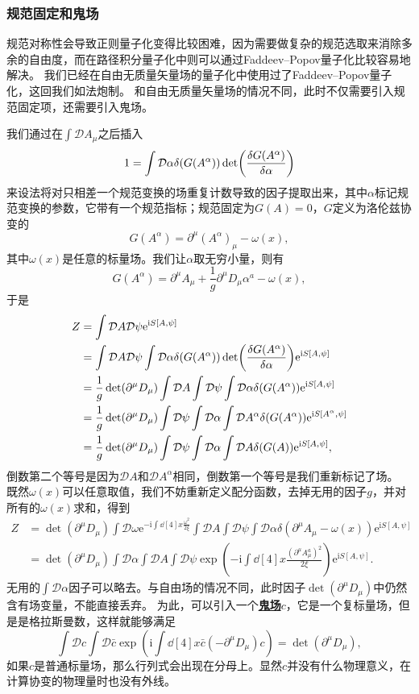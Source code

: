 \documentclass[hyperref, UTF8, a4paper]{ctexart}
\newcommand*{\ii}{\mathrm{i}}
\newcommand*{\ee}{\mathrm{e}}
\newcommand*{\fd}[1]{{\mathcal{D} #1}}
\newcommand{\concept}[1]{\underline{\textbf{#1}}}
\begin{document}
\subsubsection{规范固定和鬼场}

规范对称性会导致正则量子化变得比较困难，因为需要做复杂的规范选取来消除多余的自由度，而在路径积分量子化中则可以通过Faddeev–Popov量子化比较容易地解决。
我们已经在自由无质量矢量场的量子化中使用过了Faddeev–Popov量子化，这回我们如法炮制。
和自由无质量矢量场的情况不同，此时不仅需要引入规范固定项，还需要引入鬼场。

我们通过在$\int \fd{A_\mu}$之后插入
\[
    1 = \int \fd{\alpha} \delta(G(A^\alpha)) \det(\fdv{G(A^\alpha)}{\alpha})
\]
来设法将对只相差一个规范变换的场重复计数导致的因子提取出来，其中$\alpha$标记规范变换的参数，它带有一个规范指标；规范固定为$G(A)=0$，$G$定义为洛伦兹协变的
\begin{equation}
    G(A^\alpha) = \partial^\mu (A^\alpha)_\mu - \omega(x),
\end{equation}
其中$\omega(x)$是任意的标量场。我们让$\alpha$取无穷小量，则有
\[
    G(A^\alpha) = \partial^\mu A_\mu + \frac{1}{g} \partial^\mu D_\mu \alpha^a - \omega(x),
\]
于是
\[
    \begin{aligned}
        Z &= \int \fd{A} \fd{\psi} \ee^{\ii S[A, \psi]} \\
        &= \int \fd{A} \fd{\psi} \int \fd{\alpha} \delta(G(A^\alpha)) \det(\fdv{G(A^\alpha)}{\alpha}) \ee^{\ii S[A, \psi]} \\
        &= \frac{1}{g} \det(\partial^\mu D_\mu) \int \fd{A} \int \fd{\psi} \int \fd{\alpha} \delta(G(A^\alpha)) \ee^{\ii S[A, \psi]} \\
        &= \frac{1}{g} \det(\partial^\mu D_\mu) \int \fd{\psi} \int \fd{\alpha} \int \fd{A^\alpha} \delta(G(A^\alpha)) \ee^{\ii S[A^\alpha, \psi]} \\
        &= \frac{1}{g} \det(\partial^\mu D_\mu) \int \fd{\psi} \int \fd{\alpha} \int \fd{A} \delta(G(A)) \ee^{\ii S[A, \psi]},
    \end{aligned}
\]
倒数第二个等号是因为$\fd{A}$和$\fd{A^\alpha}$相同，倒数第一个等号是我们重新标记了场。
既然$\omega(x)$可以任意取值，我们不妨重新定义配分函数，去掉无用的因子$g$，并对所有的$\omega(x)$求和，得到
\[
    \begin{aligned}
        Z &= \det(\partial^\mu D_\mu) \int \fd{\omega} \ee^{-\ii \int \dd[4]{x} \frac{\omega^2}{2 \xi}} \int \fd{A} \int \fd{\psi} \int \fd{\alpha} \delta(\partial^\mu A_\mu - \omega(x)) \ee^{\ii S[A, \psi]} \\
        &= \det(\partial^\mu D_\mu) \int \fd{\alpha} \int \fd{A} \int \fd{\psi} \exp(-\ii \int \dd[4]{x} \frac{(\partial^\mu A_\mu^a)^2}{2 \xi}) \ee^{\ii S[A, \psi]}.
    \end{aligned}
\]
无用的$\int \fd{\alpha}$因子可以略去。与自由场的情况不同，此时因子$\det(\partial^\mu D_\mu)$中仍然含有场变量，不能直接丢弃。
为此，可以引入一个\concept{鬼场}$c$，它是一个复标量场，但是是格拉斯曼数，这样就能够满足
\[
    \int \fd{c} \int \fd{\bar{c}} \exp(\ii \int \dd[4]{x} \bar{c} (- \partial^\mu D_\mu) c) = \det(\partial^\mu D_\mu),
\]
如果$c$是普通标量场，那么行列式会出现在分母上。显然$c$并没有什么物理意义，在计算协变的物理量时也没有外线。
\end{document}
